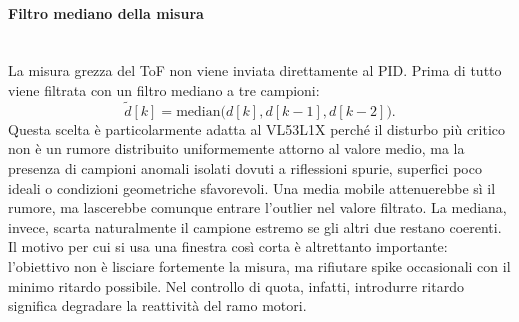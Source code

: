 \documentclass[11pt]{report}
\begin{document}
	\paragraph{Filtro mediano della misura}\mbox{}\\
	La misura grezza del ToF non viene inviata direttamente al PID. Prima di tutto viene filtrata con un filtro mediano a tre campioni:
	\begin{equation}
		\tilde d[k] = \mathrm{median}\bigl(d[k], d[k-1], d[k-2]\bigr).
	\end{equation}
	Questa scelta è particolarmente adatta al VL53L1X perché il disturbo più critico non è un rumore distribuito uniformemente attorno al valore medio, ma la presenza di campioni anomali isolati dovuti a riflessioni spurie, superfici poco ideali o condizioni geometriche sfavorevoli. Una media mobile attenuerebbe sì il rumore, ma lascerebbe comunque entrare l'outlier nel valore filtrato. La mediana, invece, scarta naturalmente il campione estremo se gli altri due restano coerenti.\\
	Il motivo per cui si usa una finestra così corta è altrettanto importante: l'obiettivo non è lisciare fortemente la misura, ma rifiutare spike occasionali con il minimo ritardo possibile. Nel controllo di quota, infatti, introdurre ritardo significa degradare la reattività del ramo motori.
\end{document}
